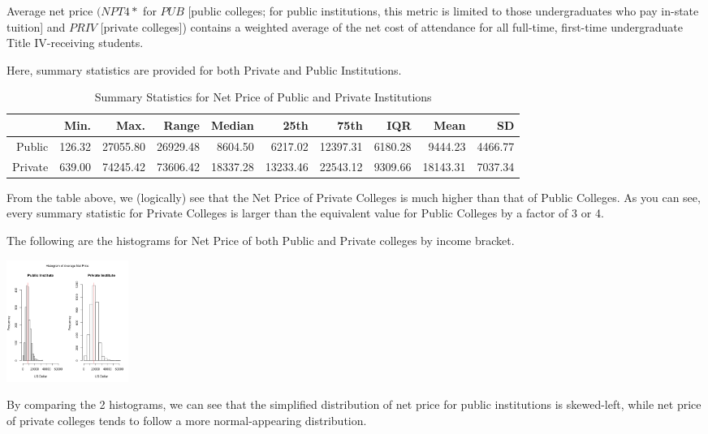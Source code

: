 \documentclass{article}\usepackage[]{graphicx}\usepackage[]{color}
\begin{document}
Average net price $(NPT4 *$ for $PUB$ [public colleges; for public institutions, this metric is limited to those undergraduates who pay in-state tuition] and $PRIV$ [private colleges]) contains a weighted average of the net cost of attendance for all full-time, first-time undergraduate Title IV-receiving students.\newline

Here, summary statistics are provided for both Private and Public Institutions.\newline

\begin{table}[ht]
\centering
\begin{tabular}{rrrrrrrrrr}
  \hline
 & Min. & Max. & Range & Median & 25th & 75th & IQR & Mean & SD \\ 
  \hline
Public & 126.32 & 27055.80 & 26929.48 & 8604.50 & 6217.02 & 12397.31 & 6180.28 & 9444.23 & 4466.77 \\ 
  Private & 639.00 & 74245.42 & 73606.42 & 18337.28 & 13233.46 & 22543.12 & 9309.66 & 18143.31 & 7037.34 \\ 
   \hline
\end{tabular}
\caption{Summary Statistics for Net Price of Public and Private Institutions} 
\end{table}


From the table above, we (logically) see that the Net Price of Private Colleges is much higher than that of Public Colleges. As you can see, every summary statistic for Private Colleges is larger than the equivalent value for Public Colleges by a factor of 3 or 4.\newline

The following are the histograms for Net Price of both Public and Private colleges by income bracket.



{\centering \includegraphics[width=150px]{../images/histogram-meanNetPrice} 

}




By comparing the 2 histograms, we can see that the simplified distribution of net price for public institutions is skewed-left, while net price of private colleges tends to follow a more normal-appearing distribution. \newline
\end{document}
